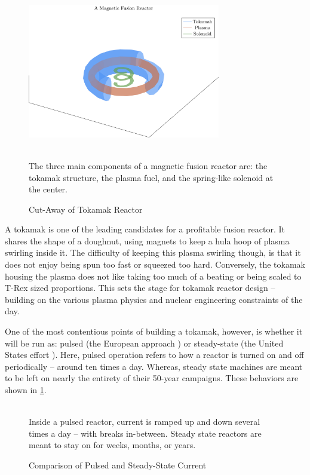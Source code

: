 \begin{figure}
	\centering
	\includegraphics[width=0.75\textwidth]{images/fusion_reactor}
	\caption{Cut-Away of Tokamak Reactor} ~\\
	\small The three main components of a magnetic fusion reactor are: the tokamak structure, the plasma fuel, and the spring-like solenoid at the center.
\end{figure}

A tokamak is one of the leading candidates for a profitable fusion reactor. It shares the shape of a doughnut, using magnets to keep a hula hoop of plasma swirling inside it. The difficulty of keeping this plasma swirling though, is that it does not enjoy being spun too fast or squeezed too hard. Conversely, the tokamak housing the plasma does not like taking too much of a beating or being scaled to T-Rex sized proportions. This sets the stage for tokamak reactor design -- building on the various plasma physics and nuclear engineering constraints of the day. 

One of the most contentious points of building a tokamak, however, is whether it will be run as: pulsed (the European approach \cite{eupulsed}) or steady-state (the United States effort \cite{ussteady}). Here, pulsed operation refers to how a reactor is turned on and off periodically -- around ten times a day. Whereas, steady state machines are meant to be left on nearly the entirety of their 50-year campaigns. These behaviors are shown in \cref{fig:pulses}.

\begin{figure}
	\centering
	\begin{adjustbox}{width=0.75\textwidth}
		
	\end{adjustbox}
	\caption{Comparison of Pulsed and Steady-State Current} ~\\
	\small Inside a pulsed reactor, current is ramped up and down several times a day -- with breaks in-between. Steady state reactors are meant to stay on for weeks, months, or years.
	\label{fig:pulses}
\end{figure}

